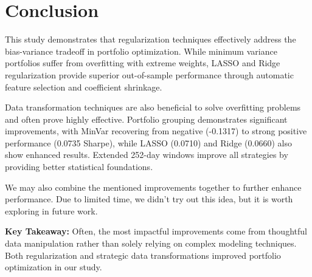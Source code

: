 \documentclass[12pt]{article}
\begin{document}
\section{Conclusion}

This study demonstrates that regularization techniques effectively address the bias-variance tradeoff in portfolio optimization. While minimum variance portfolios suffer from overfitting with extreme weights, LASSO and Ridge regularization provide superior out-of-sample performance through automatic feature selection and coefficient shrinkage.

Data transformation techniques are also beneficial to solve overfitting problems and often prove highly effective. Portfolio grouping demonstrates significant improvements, with MinVar recovering from negative (-0.1317) to strong positive performance (0.0735 Sharpe), while LASSO (0.0710) and Ridge (0.0660) also show enhanced results. Extended 252-day windows improve all strategies by providing better statistical foundations.

We may also combine the mentioned improvements together to further enhance performance. Due to limited time, we didn't try out this idea, but it is worth exploring in future work.

\textbf{Key Takeaway:} Often, the most impactful improvements come from thoughtful data manipulation rather than solely relying on complex modeling techniques. Both regularization and strategic data transformations improved portfolio optimization in our study.
\end{document}
